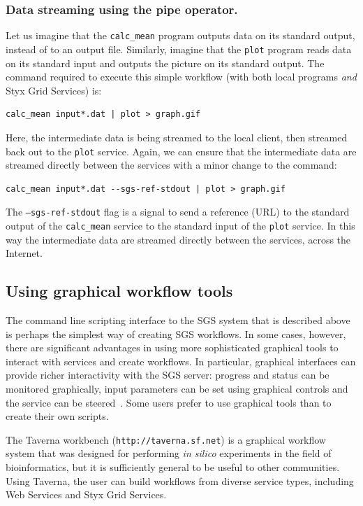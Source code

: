 \documentclass{llncs}
\begin{document}
\subsubsection{Data streaming using the pipe operator.}\label{sec:pipes}
Let us imagine that the {\tt calc\_mean} program outputs data on its standard output, instead of to an output file.  Similarly, imagine that the {\tt plot} program reads data on its standard input and outputs the picture on its standard output.  The command required to execute this simple workflow (with both local programs {\em and\/} Styx Grid Services) is:

\begin{verbatim}
calc_mean input*.dat | plot > graph.gif
\end{verbatim}

Here, the intermediate data is being streamed to the local client, then streamed back out to the {\tt plot} service.  Again, we can ensure that the intermediate data are streamed directly between the services with a minor change to the command:

\begin{verbatim}
calc_mean input*.dat --sgs-ref-stdout | plot > graph.gif
\end{verbatim}

The {\tt --sgs-ref-stdout} flag is a signal to send a reference (URL) to the standard output of the {\tt calc\_mean} service to the standard input of the {\tt plot} service.  In this way the intermediate data are streamed directly between the services, across the Internet.

\subsection{Using graphical workflow tools}\label{subsec:graphical-workflow}
The command line scripting interface to the SGS system that is described above is perhaps the simplest way of creating SGS workflows.  In some cases, however, there are significant advantages in using more sophisticated graphical tools to interact with services and create workflows.  In particular, graphical interfaces can provide richer interactivity with the SGS server: progress and status can be monitored graphically, input parameters can be set using graphical controls and the service can be steered~\cite{blower:2005}.  Some users prefer to use graphical tools than to create their own scripts.

The Taverna workbench ({\tt http://taverna.sf.net}) is a graphical workflow system that was designed for performing {\it in silico} experiments in the field of bioinformatics, but it is sufficiently general to be useful to other communities.  Using Taverna, the user can build workflows from diverse service types, including Web Services and Styx Grid Services.
\end{document}
